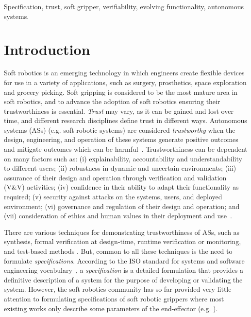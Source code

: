 \documentclass[lettersize,journal]{IEEEtran}
\begin{document}
\begin{IEEEkeywords}
	Specification, trust, soft gripper, verifiability, evolving functionality, autonomous systems.
\end{IEEEkeywords}

\section{Introduction}\label{introduction}
Soft robotics is an emerging technology in which engineers create flexible devices for use in a variety of applications, such as surgery, prosthetics, space exploration and grocery picking. 
Soft gripping is considered to be the most mature area in soft robotics, and to advance the adoption of soft robotics ensuring their trustworthiness is essential. 
\emph{Trust} may vary, as it can be gained and lost over time, and different research disciplines define trust in different ways. 
Autonomous systems (ASs) (e.g. soft robotic systems) are considered \emph{trustworthy} when the design, engineering, and operation of these systems generate positive outcomes and mitigate outcomes which can be harmful~\cite{Naiseh2022}.
Trustworthiness can be dependent on many factors such as: (i) explainability, accountability and understandability to different users; (ii) robustness in dynamic and uncertain environments; (iii) assurance of their design and operation through verification and validation (V\&V) activities; (iv) confidence in their ability to adapt their functionality as required; (v) security against attacks on the systems, users, and deployed environment; (vi) governance and regulation of their design and operation; and (vii) consideration of ethics and human values in their deployment and use~\cite{Naiseh2022}. 

There are various techniques for demonstrating trustworthiness of ASs, such as synthesis, formal verification at design-time, runtime verification or monitoring, and test-based methods \cite{Abeywickrama2022}. 
But, common to all these techniques is the need to formulate \emph{specifications}. 	
According to the ISO standard for systems and software engineering vocabulary~\cite{ISO24765:2017}, a \emph{specification} is a detailed formulation that provides a definitive description of a system for the purpose of developing or validating the system. 
However, the soft robotics community has so far provided very little attention to formulating specifications of soft robotic grippers where most existing works only describe some parameters of the end-effector (e.g. \cite{Hong2022,Bhattacharya2019,Tadakuma2020,Loh2014,Nishikawa2019,Mohan2020}).  
\end{document}
